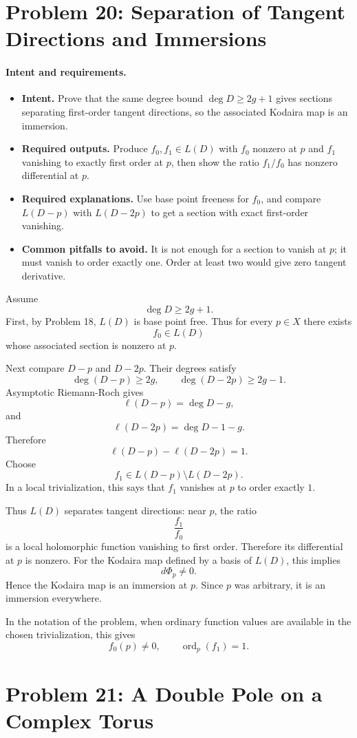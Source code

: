 \documentclass[11pt]{article}
\newcommand{\ord}{\operatorname{ord}}
\newenvironment{intentrequirements}{%
\paragraph{Intent and requirements.}
\begin{itemize}[leftmargin=*, itemsep=0.25em]
}{%
\end{itemize}
}
\begin{document}
\section*{Problem 20: Separation of Tangent Directions and Immersions}

\begin{intentrequirements}
\item \textbf{Intent.} Prove that the same degree bound $\deg D\geq2g+1$ gives sections separating first-order tangent directions, so the associated Kodaira map is an immersion.
\item \textbf{Required outputs.} Produce $f_0,f_1\in L(D)$ with $f_0$ nonzero at $p$ and $f_1$ vanishing to exactly first order at $p$, then show the ratio $f_1/f_0$ has nonzero differential at $p$.
\item \textbf{Required explanations.} Use base point freeness for $f_0$, and compare $L(D-p)$ with $L(D-2p)$ to get a section with exact first-order vanishing.
\item \textbf{Common pitfalls to avoid.} It is not enough for a section to vanish at $p$; it must vanish to order exactly one. Order at least two would give zero tangent derivative.
\end{intentrequirements}

Assume
\[
 \deg D\geq2g+1.
\]
First, by Problem 18, $L(D)$ is base point free. Thus for every $p\in X$ there exists
\[
 f_0\in L(D)
\]
whose associated section is nonzero at $p$.

Next compare $D-p$ and $D-2p$. Their degrees satisfy
\[
 \deg(D-p)\geq2g,
\qquad
 \deg(D-2p)\geq2g-1.
\]
Asymptotic Riemann-Roch gives
\[
 \ell(D-p)=\deg D-g,
\]
and
\[
 \ell(D-2p)=\deg D-1-g.
\]
Therefore
\[
 \ell(D-p)-\ell(D-2p)=1.
\]
Choose
\[
 f_1\in L(D-p)\setminus L(D-2p).
\]
In a local trivialization, this says that $f_1$ vanishes at $p$ to order exactly $1$.

Thus $L(D)$ separates tangent directions: near $p$, the ratio
\[
 \frac{f_1}{f_0}
\]
is a local holomorphic function vanishing to first order. Therefore its differential at $p$ is nonzero. For the Kodaira map defined by a basis of $L(D)$, this implies
\[
 d\Phi_p\neq0.
\]
Hence the Kodaira map is an immersion at $p$. Since $p$ was arbitrary, it is an immersion everywhere.

In the notation of the problem, when ordinary function values are available in the chosen trivialization, this gives
\[
 f_0(p)\neq0,
\qquad
 \ord_p(f_1)=1.
\]

\section*{Problem 21: A Double Pole on a Complex Torus}
\end{document}
